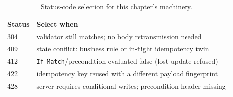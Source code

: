 \begin{table}[h]
  \centering
  \small
  \begin{tabular}{l l}
    \toprule
    \textbf{Status} & \textbf{Select when} \\
    \midrule
    304 & validator still matches; no body retransmission needed \\
    409 & state conflict: business rule or in-flight idempotency twin \\
    412 & \texttt{If-Match}/precondition evaluated false (lost update refused) \\
    422 & idempotency key reused with a different payload fingerprint \\
    428 & server requires conditional writes; precondition header missing \\
    \bottomrule
  \end{tabular}
  \caption{Status-code selection for this chapter's machinery.}
\end{table}


